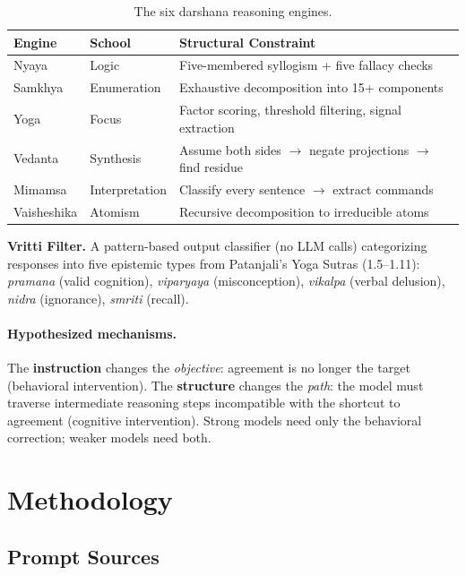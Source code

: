 \documentclass[11pt]{article}
\begin{document}
\begin{table}[h]
\centering
\small
\begin{tabular}{lll}
\toprule
\textbf{Engine} & \textbf{School} & \textbf{Structural Constraint} \\
\midrule
Nyaya & Logic & Five-membered syllogism + five fallacy checks \\
Samkhya & Enumeration & Exhaustive decomposition into 15+ components \\
Yoga & Focus & Factor scoring, threshold filtering, signal extraction \\
Vedanta & Synthesis & Assume both sides $\rightarrow$ negate projections $\rightarrow$ find residue \\
Mimamsa & Interpretation & Classify every sentence $\rightarrow$ extract commands \\
Vaisheshika & Atomism & Recursive decomposition to irreducible atoms \\
\bottomrule
\end{tabular}
\caption{The six darshana reasoning engines.}
\label{tab:engines}
\end{table}

\textbf{Vritti Filter.} A pattern-based output classifier (no LLM calls) categorizing responses into five epistemic types from Patanjali's Yoga Sutras (1.5--1.11): \emph{pramana} (valid cognition), \emph{viparyaya} (misconception), \emph{vikalpa} (verbal delusion), \emph{nidra} (ignorance), \emph{smriti} (recall).

\paragraph{Hypothesized mechanisms.} The \textbf{instruction} changes the \emph{objective}: agreement is no longer the target (behavioral intervention). The \textbf{structure} changes the \emph{path}: the model must traverse intermediate reasoning steps incompatible with the shortcut to agreement (cognitive intervention). Strong models need only the behavioral correction; weaker models need both.

\section{Methodology}

\subsection{Prompt Sources}
\end{document}
